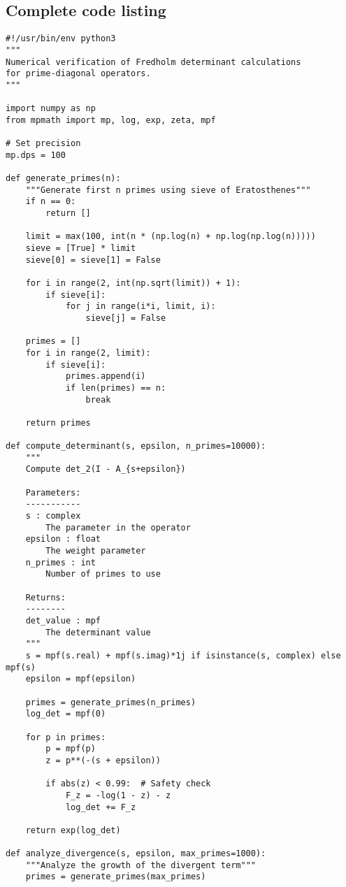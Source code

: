 \documentclass[11pt,a4paper]{article}
\theoremstyle{definition}
\theoremstyle{remark}
\begin{document}
\subsection{Complete code listing}

\begin{lstlisting}
#!/usr/bin/env python3
"""
Numerical verification of Fredholm determinant calculations
for prime-diagonal operators.
"""

import numpy as np
from mpmath import mp, log, exp, zeta, mpf

# Set precision
mp.dps = 100

def generate_primes(n):
    """Generate first n primes using sieve of Eratosthenes"""
    if n == 0:
        return []
    
    limit = max(100, int(n * (np.log(n) + np.log(np.log(n)))))
    sieve = [True] * limit
    sieve[0] = sieve[1] = False
    
    for i in range(2, int(np.sqrt(limit)) + 1):
        if sieve[i]:
            for j in range(i*i, limit, i):
                sieve[j] = False
    
    primes = []
    for i in range(2, limit):
        if sieve[i]:
            primes.append(i)
            if len(primes) == n:
                break
    
    return primes

def compute_determinant(s, epsilon, n_primes=10000):
    """
    Compute det_2(I - A_{s+epsilon})
    
    Parameters:
    -----------
    s : complex
        The parameter in the operator
    epsilon : float
        The weight parameter
    n_primes : int
        Number of primes to use
        
    Returns:
    --------
    det_value : mpf
        The determinant value
    """
    s = mpf(s.real) + mpf(s.imag)*1j if isinstance(s, complex) else mpf(s)
    epsilon = mpf(epsilon)
    
    primes = generate_primes(n_primes)
    log_det = mpf(0)
    
    for p in primes:
        p = mpf(p)
        z = p**(-(s + epsilon))
        
        if abs(z) < 0.99:  # Safety check
            F_z = -log(1 - z) - z
            log_det += F_z
    
    return exp(log_det)

def analyze_divergence(s, epsilon, max_primes=1000):
    """Analyze the growth of the divergent term"""
    primes = generate_primes(max_primes)
    

\end{lstlisting}
\end{document}
